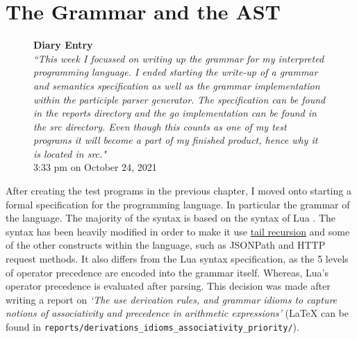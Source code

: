 \section{The Grammar and the AST}

\begin{figure}[H]
    \begin{center}
        \textbf{Diary Entry}\\[0.5em]
        \textit{``This week I focussed on writing up the grammar for my interpreted programming language. I ended starting the write-up of a grammar and semantics specification as well as the grammar implementation within the participle parser generator. The specification can be found in the reports directory and the go implementation can be found in the src directory. Even though this counts as one of my test programs it will become a part of my finished product, hence why it is located in src."}\\[0.5em]
        \tiny{3:33 pm on October 24, 2021}
    \end{center}
\end{figure}

After creating the test programs in the previous chapter, I moved onto starting a formal specification for the programming language. In particular the grammar of the language. The majority of the syntax is based on the syntax of Lua \textsuperscript{\cite{lua_syntax_specification}}. The syntax has been heavily modified in order to make it use \hyperref[chap:discussion]{tail recursion} and some of the other constructs within the language, such as JSONPath and HTTP request methods. It also differs from the Lua syntax specification, as the 5 levels of operator precedence are encoded into the grammar itself. Whereas, Lua's operator precedence is evaluated after parsing. This decision was made after writing a report on \textit{`The use derivation rules, and grammar idioms to capture notions of associativity and precedence in arithmetic expressions'} (\LaTeX \hspace{0.75mm} can be found in \verb|reports/derivations_idioms_associativity_priority/|).

